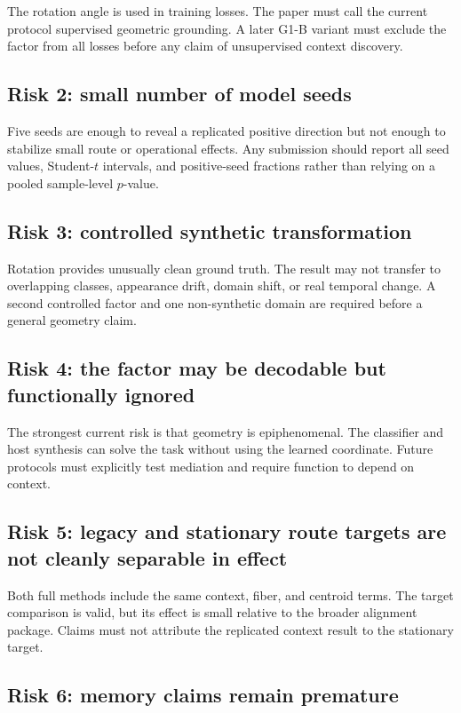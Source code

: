 \documentclass[11pt,a4paper]{article}
\begin{document}
The rotation angle is used in training losses. The paper must call the current protocol supervised geometric grounding. A later G1-B variant must exclude the factor from all losses before any claim of unsupervised context discovery.

\subsection{Risk 2: small number of model seeds}

Five seeds are enough to reveal a replicated positive direction but not enough to stabilize small route or operational effects. Any submission should report all seed values, Student-$t$ intervals, and positive-seed fractions rather than relying on a pooled sample-level $p$-value.

\subsection{Risk 3: controlled synthetic transformation}

Rotation provides unusually clean ground truth. The result may not transfer to overlapping classes, appearance drift, domain shift, or real temporal change. A second controlled factor and one non-synthetic domain are required before a general geometry claim.

\subsection{Risk 4: the factor may be decodable but functionally ignored}

The strongest current risk is that geometry is epiphenomenal. The classifier and host synthesis can solve the task without using the learned coordinate. Future protocols must explicitly test mediation and require function to depend on context.

\subsection{Risk 5: legacy and stationary route targets are not cleanly separable in effect}

Both full methods include the same context, fiber, and centroid terms. The target comparison is valid, but its effect is small relative to the broader alignment package. Claims must not attribute the replicated context result to the stationary target.

\subsection{Risk 6: memory claims remain premature}
\end{document}
